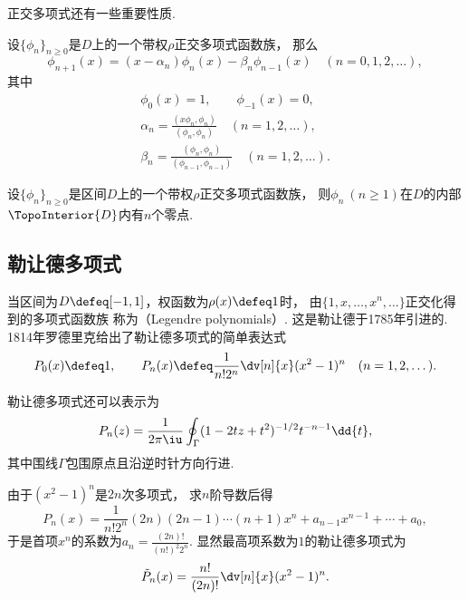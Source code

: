 正交多项式还有一些重要性质.
\begin{theorem}
设\(\{\phi_n\}_{n\geq0}\)是\(D\)上的一个带权\(\rho\)正交多项式函数族，
那么\begin{equation}
	\phi_{n+1}(x)
	= (x - \alpha_n) \phi_n(x)
	- \beta_n \phi_{n-1}(x)
	\quad(n=0,1,2,\dotsc),
\end{equation}
其中\begin{gather*}
	\phi_0(x) = 1,
	\qquad
	\phi_{-1}(x) = 0, \\
	\alpha_n
	= \frac{(x \phi_n,\phi_n)}{(\phi_n,\phi_n)}
	\quad(n=1,2,\dotsc), \\
	\beta_n
	= \frac{(\phi_n,\phi_n)}{(\phi_{n-1},\phi_{n-1})}
	\quad(n=1,2,\dotsc).
\end{gather*}
\end{theorem}

\begin{theorem}
设\(\{\phi_n\}_{n\geq0}\)是区间\(D\)上的一个带权\(\rho\)正交多项式函数族，
则\(\phi_n\ (n\geq1)\)在\(D\)的内部\(\TopoInterior{D}\)内有\(n\)个零点.
\end{theorem}

\subsection{勒让德多项式}
当区间为\(D \defeq [-1,1]\)，权函数为\(\rho(x) \defeq 1\)时，
由\(\{1,x,\dotsc,x^n,\dotsc\}\)正交化得到的多项式函数族
称为（Legendre polynomials）.
这是勒让德于1785年引进的.
1814年罗德里克给出了勒让德多项式的简单表达式\begin{equation}
	P_0(x) \defeq 1,
	\qquad
	P_n(x) \defeq \frac1{n!2^n} \dv[n]{x} (x^2-1)^n
	\quad(n=1,2,\dotsc).
\end{equation}

勒让德多项式还可以表示为\begin{equation}
	P_n(z)
	= \frac1{2\pi\iu} \oint_\Gamma (1 - 2 t z + t^2)^{-1/2} t^{-n-1} \dd{t},
\end{equation}
其中围线\(\Gamma\)包围原点且沿逆时针方向行进.

由于\((x^2-1)^n\)是\(2n\)次多项式，
求\(n\)阶导数后得\begin{equation*}
	P_n(x) = \frac1{n!2^n} (2n)(2n-1)\dotsm(n+1)x^n + a_{n-1} x^{n-1} + \dotsb + a_0,
\end{equation*}
于是首项\(x^n\)的系数为\(a_n = \frac{(2n)!}{(n!)^2 2^n}\).
显然最高项系数为\(1\)的勒让德多项式为\begin{equation*}
	\tilde{P}_n(x)
	= \frac{n!}{(2n)!} \dv[n]{x} (x^2-1)^n.
\end{equation*}

